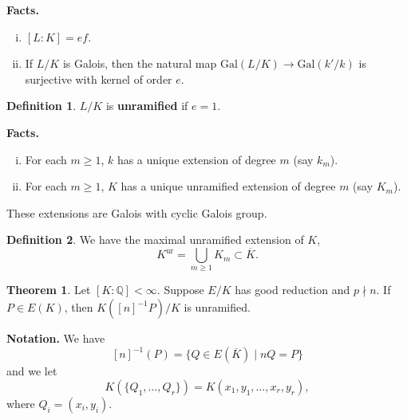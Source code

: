 \documentclass{article}
\theoremstyle{definition}
\newtheorem{theorem}{Theorem}[section]
\newtheorem{defn}{Definition}[section]
\begin{document}
\textbf{Facts.} 
\begin{enumerate}[(i)]
    \item $[L:K] = ef$.
    \item If $L/K$ is Galois, then the natural map $\text{Gal}(L/K) \to \text{Gal}(k'/k)$ is surjective with kernel of order $e$.
\end{enumerate}
\begin{defn}
    $L/K$ is \textbf{unramified} if $e=1$.
\end{defn}
\textbf{Facts.}
\begin{enumerate}[(i)]
    \item For each $m\ge 1$, $k$ has a unique extension of degree $m$ (say $k_m$).
    \item For each $m\ge 1$, $K$ has a unique unramified extension of degree $m$ (say $K_m$).
\end{enumerate} 
These extensions are Galois with cyclic Galois group.
\begin{defn}
    We have the maximal unramified extension of $K$, $$K^{\text{ur}} = \bigcup_{m\ge 1} K_m \subset \overline{K}.$$
\end{defn}
\begin{theorem}\label{theorem9.8}
    Let $[K:\mathbb{Q}]<\infty$. Suppose $E/K$ has good reduction and $p \nmid n$. If $P \in E(K)$, then $K([n]^{-1}P)/K$ is unramified.
\end{theorem}
\textbf{Notation.} We have
\[
[n]^{-1}(P)=\{Q \in E(\overline{K}) \mid nQ=P\}
\] 
and we let 
\[
K(\{Q_1,\ldots,Q_r\})=K(x_1,y_1,\ldots,x_r,y_r),
\]
where $Q_i = (x_i,y_i)$.
\end{document}
